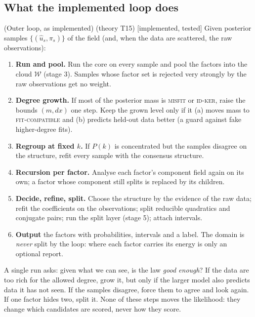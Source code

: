 \documentclass[11pt,a4paper]{article}
\theoremstyle{definition}
\newcommand{\badge}[2]{\textcolor{#1}{\textsf{\footnotesize[#2]}}}
\newcommand{\impl}{\badge{cC}{implemented, tested}}
\newcommand{\thy}[1]{\textcolor{cG}{\textsf{\footnotesize(theory #1)}}}
\begin{document}
\subsection{What the implemented loop does}
\begin{theorem}{(Outer loop, as implemented) \thy{T15} \impl}\label{thm:loop}
Given posterior samples $\{(\hat u_s,\pi_s)\}$ of the field (and, when the data are scattered, the raw observations):
\begin{enumerate}[nosep]
\item \textbf{Run and pool.} Run the core on every sample and pool the factors into the cloud $\mathcal W$ (stage 3). Samples whose factor set is rejected very strongly by the raw observations get no weight.
\item \textbf{Degree growth.} If most of the posterior mass is \textsc{misfit} or \textsc{id-ker}, raise the bounds $(m,dx)$ one step. Keep the grown level only if it (a) moves mass to \textsc{fit-compatible} and (b) predicts held-out data better (a guard against fake higher-degree fits).
\item \textbf{Regroup at fixed $k$.} If $P(k)$ is concentrated but the samples disagree on the structure, refit every sample with the consensus structure.
\item \textbf{Recursion per factor.} Analyse each factor's component field again on its own; a factor whose component still splits is replaced by its children.
\item \textbf{Decide, refine, split.} Choose the structure by the evidence of the raw data; refit the coefficients on the observations; split reducible quadratics and conjugate pairs; run the split layer (stage 5); attach intervals.
\item \textbf{Output} the factors with probabilities, intervals and a label. The domain is \emph{never} split by the loop: where each factor carries its energy is only an optional report.
\end{enumerate}
\end{theorem}
\begin{intuition}
A single run asks: given what we can see, is the law \emph{good enough}? If the data are too rich for the allowed degree, grow it, but only if the larger model also predicts data it has not seen. If the samples disagree, force them to agree and look again. If one factor hides two, split it. None of these steps moves the likelihood: they change which candidates are scored, never how they score.
\end{intuition}
\end{document}
